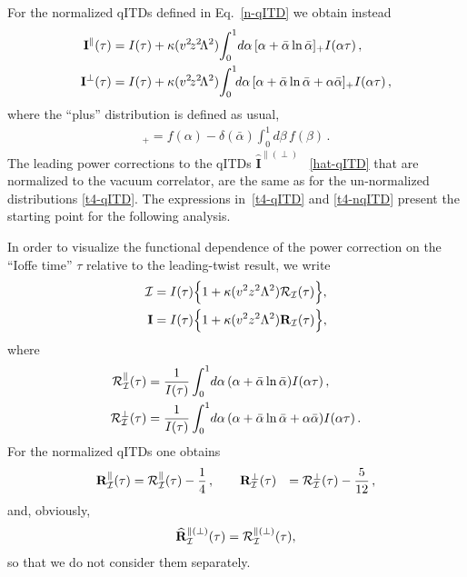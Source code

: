 For the normalized qITDs defined in Eq.~\eqref{n-qITD} we obtain instead
\begin{align}
\label{t4-nqITD}
  \mathbf{I}^\parallel(\tau)
&= I(\tau) +
  \kappa (v^2\! z^2\!\Lambda^2) \!\int_0^1\!d\alpha \, [\alpha + \bar\alpha \ln \bar\alpha]_+I(\alpha \tau )\,,
\notag\\
  \mathbf{I}^\perp(\tau)
&= I(\tau) +
  \kappa (v^2\! z^2\!\Lambda^2) \!\int_0^1\!\!d\alpha \, [\alpha + \bar\alpha \ln \bar\alpha + \alpha\bar\alpha]_+I(\alpha \tau )\,,
\end{align} 
where the ``plus'' distribution is defined as usual,
\begin{align}
  [f(\alpha)]_+ = f(\alpha) - \delta(\bar\alpha)\int_0^1 d\beta\, f(\beta)\,. 
\end{align}
The leading power corrections to the qITDs 
$\widehat{\mathbf{I}}^{\parallel(\perp)}$ ~\eqref{hat-qITD} that are normalized to the vacuum correlator,
are the same as for the un-normalized distributions \eqref{t4-qITD}.
The expressions in~\eqref{t4-qITD} and \eqref{t4-nqITD} present the starting point for the following analysis.

In order to visualize the functional dependence of the power correction on the ``Ioffe time'' $\tau$ relative to the leading-twist result, we write 
\begin{align}
    \mathcal{I} &= I(\tau)\Big\{ 1 + \kappa (v^2 z^2\Lambda^2) \mathcal{R}_{\mathcal{I}}(\tau)\Big\},
\notag\\
    \mathbf{I} &= I(\tau)\Big\{ 1 + \kappa (v^2 z^2\Lambda^2) \mathbf{R}_{\mathcal{I}}(\tau)\Big\},
\end{align}
where
\begin{align}
\mathcal{R}_{\mathcal{I}}^\parallel(\tau) & = \frac{1}{I(\tau)} \int_0^1\!d\alpha \, 
(\alpha + \bar\alpha \ln \bar\alpha)I(\alpha \tau)\,,
\notag\\  
\mathcal{R}_{\mathcal{I}}^\perp(\tau)
& = \frac{1}{I(\tau)} \int_0^1\!d\alpha \, 
(\alpha + \bar\alpha \ln \bar\alpha + \alpha\bar\alpha)I(\alpha \tau)\,.
\end{align}
For the normalized qITDs one obtains 
\begin{align}
  \mathbf{R}_{\mathcal{I}}^\parallel(\tau) &= \mathcal{R}_{\mathcal{I}}^\parallel(\tau) - \frac14\,, 
\qquad
  \mathbf{R}_{\mathcal{I}}^\perp(\tau) &= \mathcal{R}_{\mathcal{I}}^\perp(\tau) - \frac5{12}\,, 
\end{align}
and, obviously, 
\begin{eqnarray}
\widehat{\mathbf{R}}_{\mathcal{I}}^{\parallel(\perp)}(\tau) = \mathcal{R}_{\mathcal{I}}^{\parallel(\perp)}(\tau),
\end{eqnarray}
so that we do not consider them separately.


